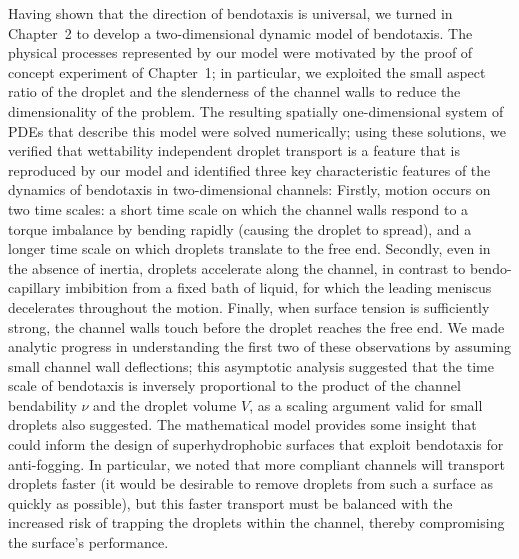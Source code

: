 Having shown that the direction of bendotaxis is universal, we turned in Chapter~2 to develop a two-dimensional dynamic model of bendotaxis. The physical processes represented by our model were motivated by the proof of concept experiment of Chapter~1; in particular, we exploited the small aspect ratio of the droplet and the slenderness of the channel walls to reduce the dimensionality of the problem. The resulting spatially one-dimensional system of PDEs that describe this model were solved numerically; using these solutions, we verified that wettability independent droplet transport is a feature that is reproduced by our model and identified three key characteristic features of the dynamics of bendotaxis in two-dimensional channels: Firstly, motion occurs on two time scales: a short time scale on which the channel walls respond to a torque imbalance by bending rapidly (causing the droplet to spread), and a longer time scale on which droplets translate to the free end. Secondly, even in the absence of inertia, droplets accelerate along the channel, in contrast to bendo-capillary imbibition from a fixed bath of liquid, for which the leading meniscus decelerates throughout the motion. Finally,  when surface tension is sufficiently strong, the channel walls touch before the droplet reaches the free end. We made analytic progress in understanding the first two of these observations by assuming small channel wall deflections;  this asymptotic analysis suggested that the time scale of bendotaxis is inversely proportional to the product of the channel bendability $\nu$ and the droplet volume $V$, as a scaling argument valid for small droplets also suggested. The mathematical model provides some insight that could inform the design of superhydrophobic surfaces  that exploit bendotaxis for anti-fogging. In particular, we noted that more compliant channels will transport droplets faster (it would be desirable to remove droplets from such a surface as quickly as possible), but this faster transport must be balanced with the increased risk of trapping the droplets within the channel, thereby compromising the surface’s performance. 

